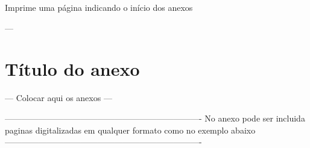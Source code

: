 
\begin{anexosenv}

	Imprime uma página indicando o início dos anexos
	\partanexos

	---
	\chapter{Título do anexo}
	---
	Colocar aqui os anexos
	---

	----------------------------------------------------------------------
	No anexo pode ser incluida paginas digitalizadas em qualquer formato
	como no exemplo abaixo
	----------------------------------------------------------------------
	


\end{anexosenv}